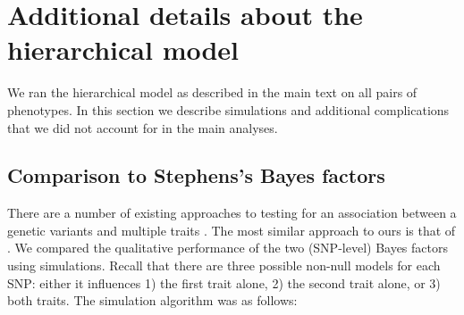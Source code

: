 \documentclass[11pt,titlepage]{article}
\begin{document}
%

%

%

%

%

%


\section{Additional details about the hierarchical model}
We ran the hierarchical model as described in the main text on all pairs of phenotypes. In this section we describe simulations and additional complications that we did not account for in the main analyses.

\subsection{Comparison to Stephens's Bayes factors}

There are a number of existing approaches to testing for an association between a genetic variants and multiple traits \citep{Zhang:2014aa, Stephens:2013fk, OReilly:2012aa, Ferreira:2009aa, Zhou:2014aa, Korte:2012aa}. The most similar approach to ours is that of \citet{Stephens:2013fk}. We compared the qualitative performance of the two (SNP-level) Bayes factors using simulations. Recall that there are three possible non-null models for each SNP: either it influences 1) the first trait alone, 2) the second trait alone, or 3) both traits. The simulation algorithm was as follows:
\end{document}
